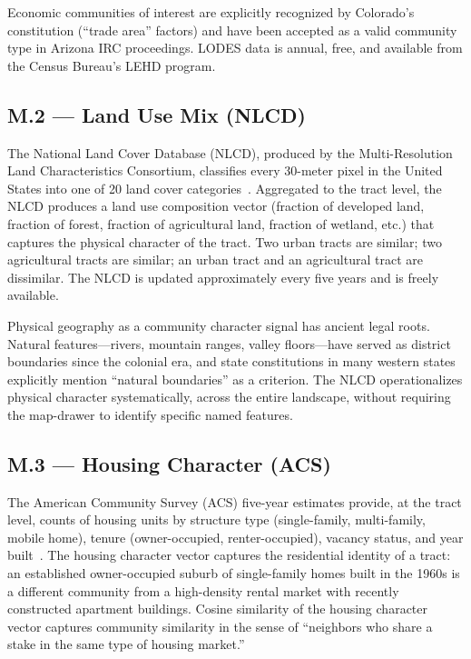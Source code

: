 Economic communities of interest are explicitly recognized by Colorado's constitution
(``trade area'' factors) and have been accepted as a valid community type in Arizona
IRC proceedings.
LODES data is annual, free, and available from the Census Bureau's LEHD program.

\subsection{M.2 --- Land Use Mix (NLCD)}

The National Land Cover Database (NLCD), produced by the Multi-Resolution Land
Characteristics Consortium, classifies every 30-meter pixel in the United States
into one of 20 land cover categories~\citep{nlcd2019}.
Aggregated to the tract level, the NLCD produces a land use composition vector
(fraction of developed land, fraction of forest, fraction of agricultural land,
fraction of wetland, etc.) that captures the physical character of the tract.
Two urban tracts are similar; two agricultural tracts are similar; an urban tract
and an agricultural tract are dissimilar.
The NLCD is updated approximately every five years and is freely available.

Physical geography as a community character signal has ancient legal roots.
Natural features---rivers, mountain ranges, valley floors---have served as district
boundaries since the colonial era, and state constitutions in many western states
explicitly mention ``natural boundaries'' as a criterion.
The NLCD operationalizes physical character systematically, across the entire landscape,
without requiring the map-drawer to identify specific named features.

\subsection{M.3 --- Housing Character (ACS)}

The American Community Survey (ACS) five-year estimates provide, at the tract level,
counts of housing units by structure type (single-family, multi-family, mobile home),
tenure (owner-occupied, renter-occupied), vacancy status, and year built~\citep{acs2020}.
The housing character vector captures the residential identity of a tract: an
established owner-occupied suburb of single-family homes built in the 1960s is a
different community from a high-density rental market with recently constructed
apartment buildings.
Cosine similarity of the housing character vector captures community similarity
in the sense of ``neighbors who share a stake in the same type of housing market.''

